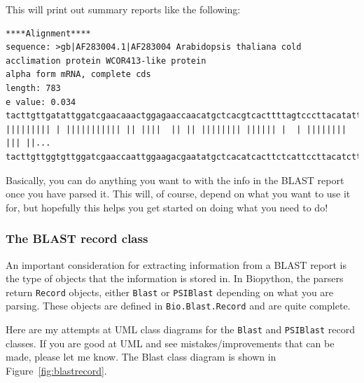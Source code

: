 \documentclass{article}
\begin{document}
This will print out summary reports like the following:

\begin{verbatim}
****Alignment****
sequence: >gb|AF283004.1|AF283004 Arabidopsis thaliana cold acclimation protein WCOR413-like protein
alpha form mRNA, complete cds
length: 783
e value: 0.034
tacttgttgatattggatcgaacaaactggagaaccaacatgctcacgtcacttttagtcccttacatattcctc...
||||||||| | ||||||||||| || ||||  || || |||||||| |||||| |  | |||||||| ||| ||...
tacttgttggtgttggatcgaaccaattggaagacgaatatgctcacatcacttctcattccttacatcttcttc...
\end{verbatim}

Basically, you can do anything you want to with the info in the BLAST report once you have parsed it. This will, of course, depend on what you want to use it for, but hopefully this helps you get started on doing what you need to do!

\subsubsection{The BLAST record class}

An important consideration for extracting information from a BLAST report is the type of objects that the information is stored in. In Biopython, the parsers return \verb|Record| objects, either \verb|Blast| or \verb|PSIBlast| depending on what you are parsing. These objects are defined in \verb|Bio.Blast.Record| and are quite complete.


Here are my attempts at UML class diagrams for the \verb|Blast| and \verb|PSIBlast| record classes. If you are good at UML and see mistakes/improvements that can be made, please let me know. The Blast class diagram is shown in Figure~\ref{fig:blastrecord}.

\begin{htmlonly}
\label{fig:blastrecord}
\end{htmlonly}
\end{document}
